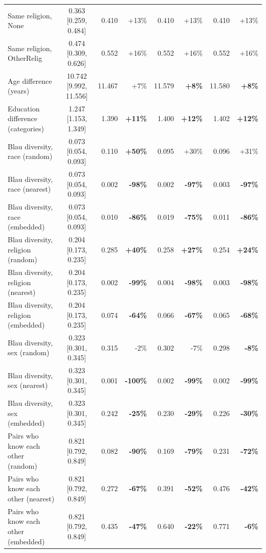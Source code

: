 \begin{tabular}{lcrrrrrr}
Same religion, None & 0.363 [0.259, 0.484] & 0.410 & +13\% & 0.410 & +13\% & 0.410 & +13\% \\
Same religion, OtherRelig & 0.474 [0.309, 0.626] & 0.552 & +16\% & 0.552 & +16\% & 0.552 & +16\% \\
Age difference (years) & 10.742 [9.992, 11.556] & 11.467 & +7\% & 11.579 & \textbf{+8\%} & 11.580 & \textbf{+8\%} \\
Education difference (categories) & 1.247 [1.153, 1.349] & 1.390 & \textbf{+11\%} & 1.400 & \textbf{+12\%} & 1.402 & \textbf{+12\%} \\
Blau diversity, race (random) & 0.073 [0.054, 0.093] & 0.110 & \textbf{+50\%} & 0.095 & +30\% & 0.096 & +31\% \\
Blau diversity, race (nearest) & 0.073 [0.054, 0.093] & 0.002 & \textbf{-98\%} & 0.002 & \textbf{-97\%} & 0.003 & \textbf{-97\%} \\
Blau diversity, race (embedded) & 0.073 [0.054, 0.093] & 0.010 & \textbf{-86\%} & 0.019 & \textbf{-75\%} & 0.011 & \textbf{-86\%} \\
Blau diversity, religion (random) & 0.204 [0.173, 0.235] & 0.285 & \textbf{+40\%} & 0.258 & \textbf{+27\%} & 0.254 & \textbf{+24\%} \\
Blau diversity, religion (nearest) & 0.204 [0.173, 0.235] & 0.002 & \textbf{-99\%} & 0.004 & \textbf{-98\%} & 0.003 & \textbf{-98\%} \\
Blau diversity, religion (embedded) & 0.204 [0.173, 0.235] & 0.074 & \textbf{-64\%} & 0.066 & \textbf{-67\%} & 0.065 & \textbf{-68\%} \\
Blau diversity, sex (random) & 0.323 [0.301, 0.345] & 0.315 & -2\% & 0.302 & -7\% & 0.298 & \textbf{-8\%} \\
Blau diversity, sex (nearest) & 0.323 [0.301, 0.345] & 0.001 & \textbf{-100\%} & 0.002 & \textbf{-99\%} & 0.002 & \textbf{-99\%} \\
Blau diversity, sex (embedded) & 0.323 [0.301, 0.345] & 0.242 & \textbf{-25\%} & 0.230 & \textbf{-29\%} & 0.226 & \textbf{-30\%} \\
Pairs who know each other (random) & 0.821 [0.792, 0.849] & 0.082 & \textbf{-90\%} & 0.169 & \textbf{-79\%} & 0.231 & \textbf{-72\%} \\
Pairs who know each other (nearest) & 0.821 [0.792, 0.849] & 0.272 & \textbf{-67\%} & 0.391 & \textbf{-52\%} & 0.476 & \textbf{-42\%} \\
Pairs who know each other (embedded) & 0.821 [0.792, 0.849] & 0.435 & \textbf{-47\%} & 0.640 & \textbf{-22\%} & 0.771 & \textbf{-6\%} \\

\end{tabular}
